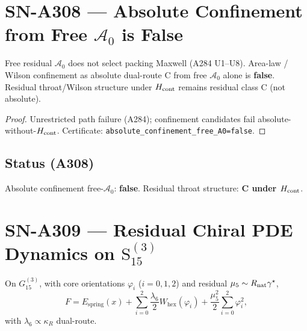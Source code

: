 \section{SN-A308 --- Absolute Confinement from Free $\mathcal{A}_0$ is False}
\label{sec:SN-A308}

\begin{theorem}
\label{thm:A308}
Free residual $\mathcal{A}_0$ does not select packing Maxwell (A284 U1--U8).
Area-law / Wilson confinement as absolute dual-route C from free $\mathcal{A}_0$ alone is \textbf{false}.
Residual throat/Wilson structure under $H_{\rm cont}$ remains residual class C (not absolute).
\end{theorem}

\begin{proof}
Unrestricted path failure (A284); confinement candidates fail absolute-without-$H_{\rm cont}$.
Certificate: \texttt{absolute\_confinement\_free\_A0=false}.
\end{proof}

\subsection*{Status (A308)}
Absolute confinement free-$\mathcal{A}_0$: \textbf{false}. Residual throat structure: \textbf{C under $H_{\rm cont}$}.

\section{SN-A309 --- Residual Chiral PDE Dynamics on $\mathrm{S}_{15}^{(3)}$}
\label{sec:SN-A309}

\begin{definition}
\label{def:A309-F}
On $G_{15}^{(3)}$, with core orientations $\varphi_i$ ($i=0,1,2$) and residual $\mu_5\sim R_{\rm nat}\gamma^\star$,
\begin{equation}
F
=
E_{\mathrm{spring}}(x)
+
\sum_{i=0}^{2}
\frac{\lambda_6}{2}W_{\mathrm{hex}}(\varphi_i)
+
\frac{\mu_5^2}{2}\sum_{i=0}^{2}\varphi_i^2,
\end{equation}
with $\lambda_6\propto\kappa_R$ dual-route.
\end{definition}

